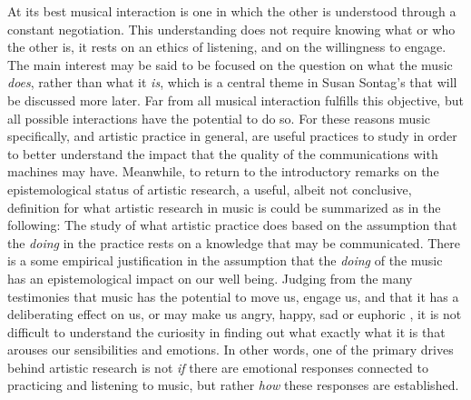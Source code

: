 \documentclass[11pt]{article}
\begin{document}
At its best musical interaction is one in which the other is understood through a constant negotiation. This understanding does not require knowing what or who the other is, it rests on an ethics of listening, and on the willingness to engage. The main interest may be said to be focused on the question on what the music \emph{does}, rather than what it \emph{is}, which is a central theme in Susan Sontag's  that will be discussed more later. Far from all musical interaction fulfills this objective, but all possible interactions have the potential to do so. For these reasons music specifically, and artistic practice in general, are useful practices to study in order to better understand the impact that the quality of the communications with machines may have. Meanwhile, to return to the introductory remarks on the epistemological status of artistic research, a useful, albeit not conclusive, definition for what artistic research in music is could be summarized as in the following: The study of what artistic practice does based on the assumption that the \emph{doing} in the practice rests on a knowledge that may be communicated. There is a some empirical justification in the assumption that the \emph{doing} of the music has an epistemological impact on our well being. Judging from the many testimonies that music has the potential to move us, engage us, and that it has a deliberating effect on us, or may make us angry, happy, sad or euphoric \citep{viper20,horwitz18,juslin19}, it is not difficult to understand the curiosity in finding out what exactly what it is that arouses our sensibilities and emotions. In other words, one of the primary drives behind artistic research is not \emph{if} there are emotional responses connected to practicing and listening to music, but rather \emph{how} these responses are established.
\end{document}
